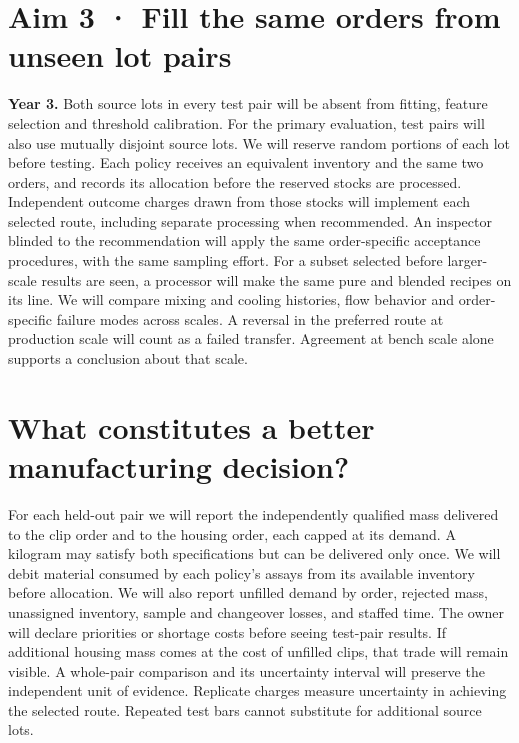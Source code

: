\documentclass[11pt,letterpaper]{article}
\begin{document}
\section*{Aim 3 · Fill the same orders from unseen lot pairs}

\textbf{Year 3.} Both source lots in every test pair will be absent from fitting, feature selection and threshold calibration. For the primary evaluation, test pairs will also use mutually disjoint source lots. We will reserve random portions of each lot before testing. Each policy receives an equivalent inventory and the same two orders, and records its allocation before the reserved stocks are processed. Independent outcome charges drawn from those stocks will implement each selected route, including separate processing when recommended. An inspector blinded to the recommendation will apply the same order-specific acceptance procedures, with the same sampling effort. For a subset selected before larger-scale results are seen, a processor will make the same pure and blended recipes on its line. We will compare mixing and cooling histories, flow behavior and order-specific failure modes across scales. A reversal in the preferred route at production scale will count as a failed transfer. Agreement at bench scale alone supports a conclusion about that scale.

\newpage

\section*{What constitutes a better manufacturing decision?}

For each held-out pair we will report the independently qualified mass delivered to the clip order and to the housing order, each capped at its demand. A kilogram may satisfy both specifications but can be delivered only once. We will debit material consumed by each policy's assays from its available inventory before allocation. We will also report unfilled demand by order, rejected mass, unassigned inventory, sample and changeover losses, and staffed time. The owner will declare priorities or shortage costs before seeing test-pair results. If additional housing mass comes at the cost of unfilled clips, that trade will remain visible. A whole-pair comparison and its uncertainty interval will preserve the independent unit of evidence. Replicate charges measure uncertainty in achieving the selected route. Repeated test bars cannot substitute for additional source lots.
\end{document}
